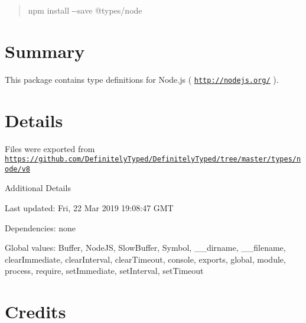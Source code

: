 \begin{quote}
{\ttfamily npm install -\/-\/save @types/node} \end{quote}


\section*{Summary}

This package contains type definitions for Node.\+js ( \href{http://nodejs.org/}{\tt http\+://nodejs.\+org/} ).

\section*{Details}

Files were exported from \href{https://github.com/DefinitelyTyped/DefinitelyTyped/tree/master/types/node/v8}{\tt https\+://github.\+com/\+Definitely\+Typed/\+Definitely\+Typed/tree/master/types/node/v8}

Additional Details
\begin{DoxyItemize}
\item Last updated\+: Fri, 22 Mar 2019 19\+:08\+:47 G\+MT
\item Dependencies\+: none
\item Global values\+: Buffer, Node\+JS, Slow\+Buffer, Symbol, \+\_\+\+\_\+dirname, \+\_\+\+\_\+filename, clear\+Immediate, clear\+Interval, clear\+Timeout, console, exports, global, module, process, require, set\+Immediate, set\+Interval, set\+Timeout
\end{DoxyItemize}

\section*{Credits}

